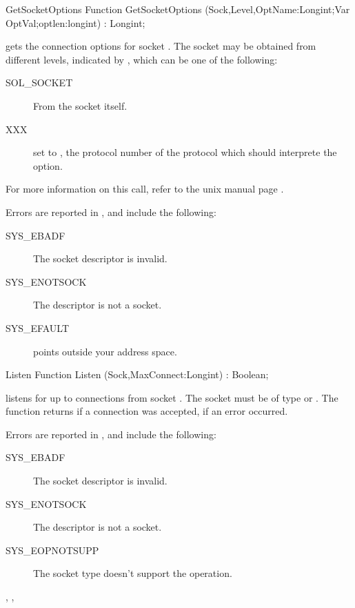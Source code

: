 \begin{function}{GetSocketOptions}
\Declaration
Function GetSocketOptions (Sock,Level,OptName:Longint;Var OptVal;optlen:longint) : Longint;

\Description
{} gets the connection options for socket .
The socket may be obtained from different levels, indicated by ,
which can be one of the following:
\begin{description}
\item[SOL\_SOCKET] From the socket itself. 
\item[XXX] set  to , the protocol number of the protocol
which should interprete the option.
 \end{description}
For more information on this call, refer to the unix manual page .

\Errors
Errors are reported in , and include the following:
\begin{description}
\item[SYS\_EBADF] The socket descriptor is invalid.
\item[SYS\_ENOTSOCK] The descriptor is not a socket.
\item[SYS\_EFAULT]  points outside your address space.
\end{description}

\SeeAlso
{}
\end{function}
\begin{function}{Listen}
\Declaration
Function Listen (Sock,MaxConnect:Longint) : Boolean;

\Description
{} listens for up to  connections from socket
. The socket  must be of type  or
.
The function returns  if a connection was accepted,  
if an error occurred.

\Errors
Errors are reported in , and include the following:
\begin{description}
\item[SYS\_EBADF] The socket descriptor is invalid.
\item[SYS\_ENOTSOCK] The descriptor is not a socket.
\item[SYS\_EOPNOTSUPP] The socket type doesn't support the 
operation.
\end{description}

\SeeAlso
{}, , 
\end{function}

